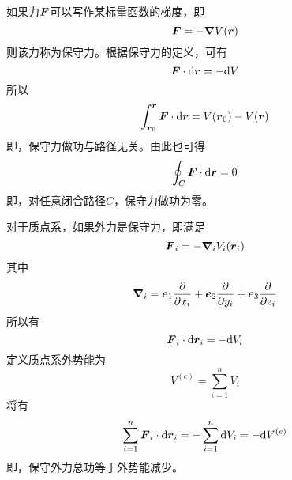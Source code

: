 如果力$\boldsymbol{F}$可以写作某标量函数的梯度，即
\begin{equation}
	\boldsymbol{F} = -\boldsymbol{\nabla} V(\boldsymbol{r})
\end{equation}
则该力称为{\heiti 保守力}。根据保守力的定义，可有
\begin{equation}
	\boldsymbol{F} \cdot \mathrm{d} \boldsymbol{r} = -\mathrm{d}V
\end{equation}
所以
\begin{equation*}
	\int_{\boldsymbol{r}_0}^{\boldsymbol{r}} \boldsymbol{F} \cdot \mathrm{d} \boldsymbol{r} = V(\boldsymbol{r}_0) - V(\boldsymbol{r})
\end{equation*}
即，保守力做功与路径无关。由此也可得
\begin{equation}
	\oint_C \boldsymbol{F} \cdot \mathrm{d} \boldsymbol{r} = 0
\end{equation}
即，对任意闭合路径$C$，保守力做功为零。

对于质点系，如果外力是保守力，即满足
\begin{equation}
	\boldsymbol{F}_i = -\boldsymbol{\nabla}_i V_i(\boldsymbol{r}_i)
\end{equation}
其中
\begin{equation}
	\boldsymbol{\nabla}_i = \boldsymbol{e}_1 \frac{\partial}{\partial x_i} + \boldsymbol{e}_2 \frac{\partial}{\partial y_i} + \boldsymbol{e}_3 \frac{\partial}{\partial z_i}
\end{equation}
所以有
\begin{equation}
	\boldsymbol{F}_i \cdot \mathrm{d} \boldsymbol{r}_i = -\mathrm{d} V_i
\end{equation}
定义{\heiti 质点系外势能}为
\begin{equation}
	V^{(e)} = \sum_{i=1}^n V_i
\end{equation}
将有
\begin{equation}
	\sum_{i=1}^n \boldsymbol{F}_i \cdot \mathrm{d} \boldsymbol{r}_i = -\sum_{i=1}^n \mathrm{d} V_i = -\mathrm{d} V^{(e)}
\end{equation}
即，保守外力总功等于外势能减少。

